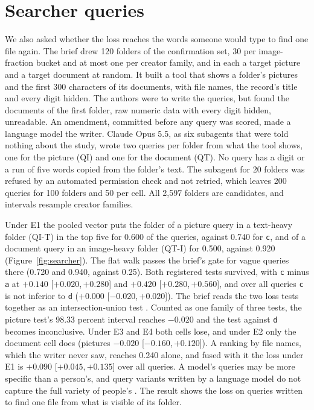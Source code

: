 \documentclass[sigconf,natbib=true,anonymous=true]{acmart}
\newcommand{\rep}[1]{\texttt{#1}}
\newcommand{\ci}[2]{[\ensuremath{#1},\,\ensuremath{#2}]}  %
\begin{document}
\section{Searcher queries}
\label{sec:searcher}

We also asked whether the loss reaches the words someone would type to find one file again. The brief drew 120 folders of the confirmation set, 30 per image-fraction bucket and at most one per creator family, and in each a target picture and a target document at random. It built a tool that shows a folder's pictures and the first 300 characters of its documents, with file names, the record's title and every digit hidden. The authors were to write the queries, but found the documents of the first folder, raw numeric data with every digit hidden, unreadable. An amendment, committed before any query was scored, made a language model the writer. Claude Opus 5.5, as six subagents that were told nothing about the study, wrote two queries per folder from what the tool shows, one for the picture (QI) and one for the document (QT). No query has a digit or a run of five words copied from the folder's text. The subagent for 20 folders was refused by an automated permission check and not retried, which leaves 200 queries for 100 folders and 50 per cell. All 2,597 folders are candidates, and intervals resample creator families.

Under E1 the pooled vector puts the folder of a picture query in a text-heavy folder (QI-T) in the top five for 0.600 of the queries, against 0.740 for \rep{c}, and of a document query in an image-heavy folder (QT-I) for 0.500, against 0.920 (Figure~\ref{fig:searcher}). The flat walk passes the brief's gate for vague queries there (0.720 and 0.940, against 0.25). Both registered tests survived, with \rep{c} minus \rep{a} at $+0.140$ \ci{+0.020}{+0.280} and $+0.420$ \ci{+0.280}{+0.560}, and over all queries \rep{c} is not inferior to \rep{d} ($+0.000$ \ci{-0.020}{+0.020}). The brief reads the two loss tests together as an intersection-union test \citep{berger1982iut}. Counted as one family of three tests, the picture test's 98.33 percent interval reaches $-0.020$ and the test against \rep{d} becomes inconclusive. Under E3 and E4 both cells lose, and under E2 only the document cell does (pictures $-0.020$ \ci{-0.160}{+0.120}). A ranking by file names, which the writer never saw, reaches 0.240 alone, and fused with it the loss under E1 is $+0.090$ \ci{+0.045}{+0.135} over all queries. A model's queries may be more specific than a person's, and query variants written by a language model do not capture the full variety of people's \citep{alaofi2023variants}. The result shows the loss on queries written to find one file from what is visible of its folder.
\end{document}
